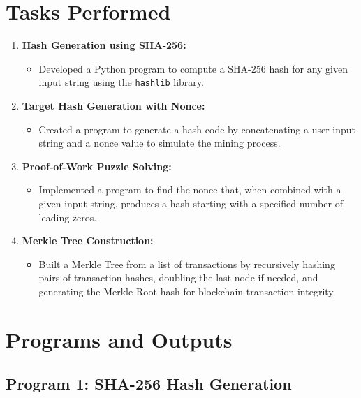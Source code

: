 \documentclass[12pt,a4paper]{article}
\begin{document}
\section{Tasks Performed}
\begin{enumerate}[label=\arabic*., leftmargin=*]
    \item \textbf{Hash Generation using SHA-256:}
    \begin{itemize}[leftmargin=1.5em]
        \item Developed a Python program to compute a SHA-256 hash for any given input string using the \texttt{hashlib} library.
    \end{itemize}

    \item \textbf{Target Hash Generation with Nonce:}
    \begin{itemize}[leftmargin=1.5em]
        \item Created a program to generate a hash code by concatenating a user input string and a nonce value to simulate the mining process.
    \end{itemize}

    \item \textbf{Proof-of-Work Puzzle Solving:}
    \begin{itemize}[leftmargin=1.5em]
        \item Implemented a program to find the nonce that, when combined with a given input string, produces a hash starting with a specified number of leading zeros.
    \end{itemize}

    \item \textbf{Merkle Tree Construction:}
    \begin{itemize}[leftmargin=1.5em]
        \item Built a Merkle Tree from a list of transactions by recursively hashing pairs of transaction hashes, doubling the last node if needed, and generating the Merkle Root hash for blockchain transaction integrity.
    \end{itemize}
\end{enumerate}

\section{Programs and Outputs}

\subsection{Program 1: SHA-256 Hash Generation}
\end{document}

